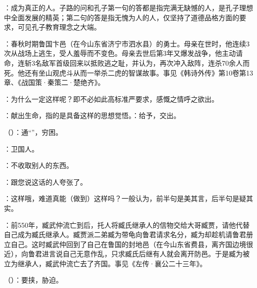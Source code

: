 {
\item {}：成为真正的人。子路的问和孔子第一句的答都是指完满无缺憾的人，是孔子理想中全面发展的精英；第二句的答是指无愧为人的人，仅坚持了道德品格方面的要求，可见孔子教育理念之大端。
\item {}：春秋时期鲁国卞邑（在今山东省济宁市泗水县）的勇士。母亲在世时，他连续3次从战场上逃生，受人羞辱而不变色。母亲去世后第3年又爆发战争，他主动请命，连斩3名敌军首级回来以抵败逃之耻，并认为，再次冲入敌阵，连杀70余人而死。他还有坐山观虎斗从而一举杀二虎的智谋故事。事见《韩诗外传》第10卷第13章、《战国策·秦策二·楚绝齐》。
\item {}：为什么一定这样呢？即不必如此高标准严要求，感慨之情呼之欲出。
\item {}：献出生命，指的是具备这样的思想觉悟。：给予，交出。
\item {}（）：通“”，穷困。
}
{}


{
\item {}：卫国人。
\item {}：不收取别人的东西。
\item {}：跟您说这话的人夸张了。
\item {}：这样哦，难道真能（做到）这样吗？一般认为，前半句是美其言，后半句是疑其实。
}
{}


{
\item {}：前550年，臧武仲流亡到后，托人将臧氏继承人的信物交给大哥臧贾，请他代替自己成为臧氏继承人。臧贾派二弟臧为带龟向鲁君请求名分，臧为却趁机请鲁君册立自己。这时臧武仲回到了自己在鲁国的封地邑（在今山东省费县，离齐国边境很近），向鲁君进言说自己无意作乱，只求臧氏后继有人就会离开防邑。于是臧为被立为继承人，臧武仲流亡去了齐国。事见《左传·襄公二十三年》。
\item {}（）：要挟，胁迫。
}
{}



